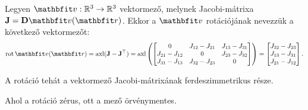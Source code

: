 \documentclass{szb-practice}
\begin{document}
\begin{definition}[Rotáció]
  Legyen $\rvec v: \Reals^3 \to \Reals^3$ vektormező, melynek Jacobi-mátrixa
  $\rmat J = \DD \rvec v(\coordvec)$. Ekkor a $\rvec v$ rotációjának nevezzük
  a következő vektormezőt:
  $$
    \rot \rvec v(\coordvec)
    = \operatorname{axl}(\rmat J - \rmat J^\T)
    = \operatorname{axl}\left(\begin{bmatrix}
        0               & J_{12} - J_{21} & J_{13} - J_{31} \\
        J_{21} - J_{12} & 0               & J_{23} - J_{32} \\
        J_{31} - J_{13} & J_{32} - J_{23} & 0
      \end{bmatrix}\right) = \begin{bmatrix}
      J_{32} - J_{23} \\
      J_{13} - J_{31} \\
      J_{21} - J_{12}
    \end{bmatrix}
    \text.
  $$
\end{definition}

\begin{note}
  A rotáció tehát a vektormező Jacobi-mátrixának ferdeszimmetrikus része.
\end{note}

\begin{note}
  Ahol a rotáció zérus, ott a mező örvénymentes.
\end{note}
\end{document}
